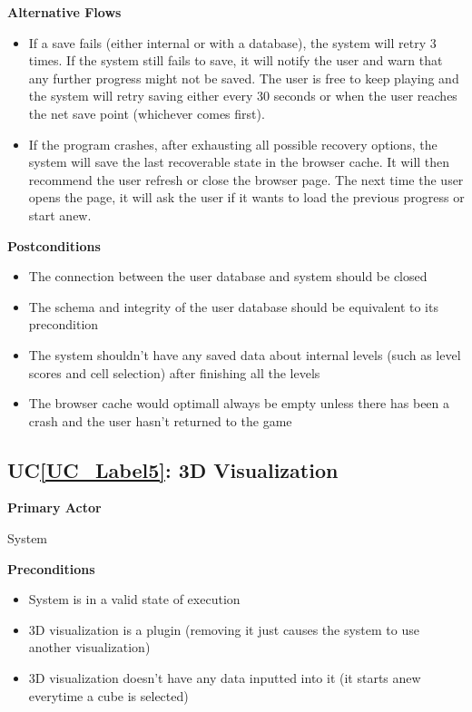 \documentclass[12pt]{article}
\newcounter{ucnum} %
\newcommand{\ucref}[1]{UC\ref{#1}}
\begin{document}
\textbf{Alternative Flows}
\begin{itemize}
\item If a save fails (either internal or with a database), the system will retry 3 times. If the system still fails to save, it will notify the user and warn that any further progress might not be saved. The user is free to keep playing and the system will retry saving either every 30 seconds or when the user reaches the net save point (whichever comes first).
\item If the program crashes, after exhausting all possible recovery options, the system will save the last recoverable state in the browser cache. It will then recommend the user refresh or close the browser page. The next time the user opens the page, it will ask the user if it wants to load the previous progress or start anew.
\end{itemize}

\textbf{Postconditions}
\begin{itemize}
\item The connection between the user database and system should be closed
\item The schema and integrity of the user database should be equivalent to its precondition 
\item The system shouldn't have any saved data about internal levels (such as level scores and cell selection) after finishing all the levels
\item The browser cache would optimall always be empty unless there has been a crash and the user hasn't returned to the game
\end{itemize}


 \label{UC_Label5}
\subsection{\ucref{UC_Label5}: 3D Visualization}

\textbf{Primary Actor}

System

\textbf{Preconditions}
\begin{itemize}
\item System is in a valid state of execution
\item 3D visualization is a plugin (removing it just causes the system to use another visualization) 
\item 3D visualization doesn't have any data inputted into it (it starts anew everytime a cube is selected)
\end{itemize}
\end{document}
